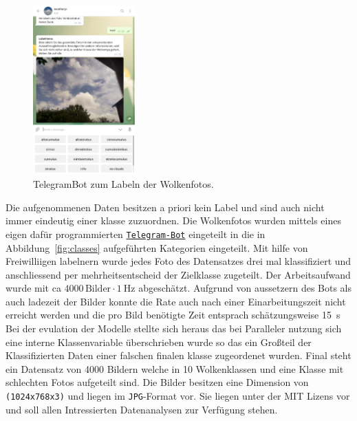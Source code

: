 \begin{figure}
		\vspace{-1.4cm}
		\centering
		\includegraphics[width=0.35\textwidth]{pictures/telegram.pdf}
		\caption{TelegramBot zum Labeln der Wolkenfotos.}
		\label{fig:}
		\vspace{-1.0cm}
\end{figure}
Die aufgenommenen Daten besitzen a priori kein Label und sind auch nicht immer
eindeutig einer klasse zuzuordnen.
Die Wolkenfotos wurden mittels eines eigen dafür programmierten
\href{https://telegram.me/weatherpi_bot}{\texttt{Telegram-Bot}} eingeteilt in
die in Abbildung~\ref{fig:classes} aufgeführten Kategorien eingeteilt.
Mit hilfe von Freiwilliigen labelnern wurde jedes Foto des Datensatzes drei mal
klassifiziert und anschliessend per mehrheitsentscheid der Zielklasse zugeteilt.
Der Arbeitsaufwand wurde mit ca $\num{4000} \, \text{Bilder} \cdot \SI{1}{\hertz}$
abgeschätzt.
Aufgrund von aussetzern des Bots als auch ladezeit der Bilder konnte die Rate
auch nach einer Einarbeitungszeit nicht erreicht werden und die pro Bild benötigte Zeit entsprach schätzungsweise
\SI{15}{\second}
Bei der evulation der Modelle stellte sich heraus das bei Paralleler nutzung
sich eine interne Klassenvariable überschrieben wurde so das ein Großteil der
Klassifizierten Daten einer falschen finalen klasse zugeordenet wurden. 
Final steht ein Datensatz von \num{4000} Bildern welche in 10 Wolkenklassen und
eine Klasse mit schlechten Fotos aufgeteilt sind. Die Bilder besitzen eine Dimension 
von \texttt{(1024x768x3)} und liegen im \texttt{JPG}-Format vor.
Sie liegen unter der MIT Lizens vor und soll allen Intressierten Datenanalysen
zur Verfügung stehen.

